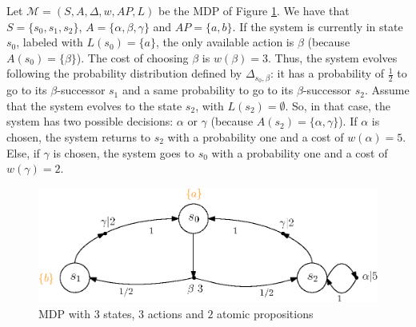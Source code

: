 \begin{example}\label{simple-mdp}
  Let $\mathcal{M} = (S, A, \Delta, w, AP, L)$ be the MDP of Figure \ref{mdp01}. We have that $S = \{s_0, s_1, s_2\}$, $A = \{\alpha, \beta, \gamma\}$ and $AP=\{a, b\}$. If the system is currently in state $s_0$, labeled with $L(s_0) = \{a\}$, the only available action is $\beta$ (because $A(s_0) = \{\beta\}$).
  The cost of choosing $\beta$ is $w(\beta) = 3$.
  Thus, the system evolves following the probability distribution defined by $\Delta_{s_0, \beta}$: it has a probability of $\frac{1}{2}$
  to go to its $\beta$-successor $s_1$ and a same probability to go to its $\beta$-successor $s_2$. Assume that the system evolves to the state $s_2$, with $L(s_2) = \emptyset$. So, in that case, the system has two possible decisions: $\alpha$ or $\gamma$ (because $A(s_2) = \{\alpha, \gamma\}$). If $\alpha$ is chosen, the system returns to $s_2$ with a probability one and a cost of $w(\alpha) = 5$. Else, if $\gamma$ is chosen, the system goes to $s_0$ with a probability one and a cost of $w(\gamma) = 2$.
  \begin{figure}[h!]
    \centering
    \includegraphics[width=0.7\linewidth]{resources/simple-mdp}
    \caption{MDP with $3$ states, $3$ actions and $2$ atomic propositions}\label{mdp01}
  \end{figure}
\end{example}

